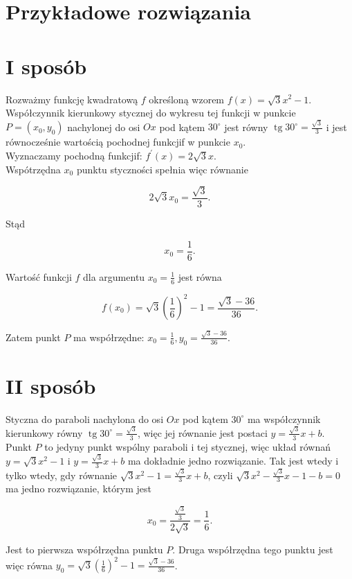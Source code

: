 \documentclass[10pt]{article}
\begin{document}
\section*{Przykładowe rozwiązania}
\section*{I sposób}
Rozważmy funkcję kwadratową $f$ określoną wzorem $f(x)=\sqrt{3} x^{2}-1$.\\
Współczynnik kierunkowy stycznej do wykresu tej funkcji w punkcie $P=\left(x_{0}, y_{0}\right)$ nachylonej do osi $O x$ pod kątem $30^{\circ}$ jest równy $\operatorname{tg} 30^{\circ}=\frac{\sqrt{3}}{3}$ i jest równocześnie wartością pochodnej funkcjif w punkcie $x_{0}$.\\
Wyznaczamy pochodną funkcjif: $f^{\prime}(x)=2 \sqrt{3} x$.\\
Wspótrzędna $x_{0}$ punktu styczności spełnia więc równanie

$$
2 \sqrt{3} x_{0}=\frac{\sqrt{3}}{3} .
$$

Stąd

$$
x_{0}=\frac{1}{6} .
$$

Wartość funkcji $f$ dla argumentu $x_{0}=\frac{1}{6}$ jest równa

$$
f\left(x_{0}\right)=\sqrt{3}\left(\frac{1}{6}\right)^{2}-1=\frac{\sqrt{3}-36}{36} .
$$

Zatem punkt $P$ ma współrzędne: $x_{0}=\frac{1}{6}, y_{0}=\frac{\sqrt{3}-36}{36}$.

\section*{II sposób}
Styczna do paraboli nachylona do osi $O x$ pod kątem $30^{\circ}$ ma współczynnik kierunkowy równy $\operatorname{tg} 30^{\circ}=\frac{\sqrt{3}}{3}$, więc jej równanie jest postaci $y=\frac{\sqrt{3}}{3} x+b$.\\
Punkt $P$ to jedyny punkt wspólny paraboli i tej stycznej, więc układ równań $y=\sqrt{3} x^{2}-1$ i $y=\frac{\sqrt{3}}{3} x+b$ ma dokładnie jedno rozwiązanie. Tak jest wtedy i tylko wtedy, gdy równanie $\sqrt{3} x^{2}-1=\frac{\sqrt{3}}{3} x+b$, czyli $\sqrt{3} x^{2}-\frac{\sqrt{3}}{3} x-1-b=0$ ma jedno rozwiązanie, którym jest

$$
x_{0}=\frac{\frac{\sqrt{3}}{3}}{2 \sqrt{3}}=\frac{1}{6} .
$$

Jest to pierwsza współrzędna punktu $P$. Druga współrzędna tego punktu jest więc równa $y_{0}=\sqrt{3}\left(\frac{1}{6}\right)^{2}-1=\frac{\sqrt{3}-36}{36}$.
\end{document}
